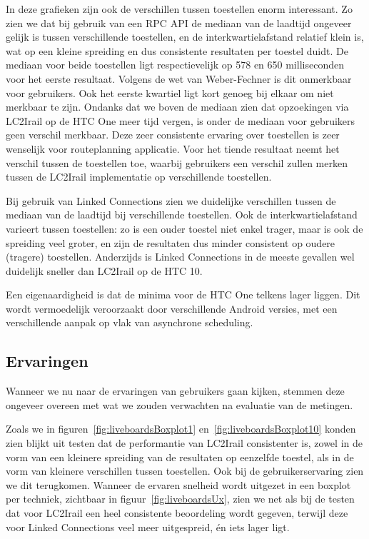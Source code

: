 In deze grafieken zijn ook de verschillen tussen toestellen enorm interessant. Zo zien we dat bij gebruik van een RPC API de mediaan van de laadtijd ongeveer gelijk is tussen verschillende toestellen, en de interkwartielafstand relatief klein is, wat op een kleine spreiding en dus consistente resultaten per toestel duidt. De mediaan voor beide toestellen ligt respectievelijk op 578 en 650 milliseconden voor het eerste resultaat. Volgens de wet van Weber-Fechner is dit onmerkbaar voor gebruikers. Ook het eerste kwartiel ligt kort genoeg bij elkaar om niet merkbaar te zijn. Ondanks dat we boven de mediaan zien dat opzoekingen via LC2Irail op de HTC One meer tijd vergen, is onder de mediaan voor gebruikers geen verschil merkbaar. Deze zeer consistente ervaring over toestellen is zeer wenselijk voor routeplanning applicatie. Voor het tiende resultaat neemt het verschil tussen de toestellen toe, waarbij gebruikers een verschil zullen merken tussen de LC2Irail implementatie op verschillende toestellen.

Bij gebruik van Linked Connections zien we duidelijke verschillen tussen de mediaan van de laadtijd bij verschillende toestellen. Ook de interkwartielafstand varieert tussen toestellen: zo is een ouder toestel niet enkel trager, maar is ook de spreiding veel groter, en zijn de resultaten dus minder consistent op oudere (tragere) toestellen. Anderzijds is Linked Connections in de meeste gevallen wel duidelijk sneller dan LC2Irail op de HTC 10.

Een eigenaardigheid is dat de minima voor de HTC One telkens lager liggen. Dit wordt vermoedelijk veroorzaakt door verschillende Android versies, met een verschillende aanpak op vlak van asynchrone scheduling.

\subsection{Ervaringen}
Wanneer we nu naar de ervaringen van gebruikers gaan kijken, stemmen deze ongeveer overeen met wat we zouden verwachten na evaluatie van de metingen.

Zoals we in figuren~\ref{fig:liveboardsBoxplot1} en~\ref{fig:liveboardsBoxplot10} konden zien blijkt uit testen dat de performantie van LC2Irail consistenter is, zowel in de vorm van een kleinere spreiding van de resultaten op eenzelfde toestel, als in de vorm van kleinere verschillen tussen toestellen. Ook bij de gebruikerservaring zien we dit terugkomen. Wanneer de ervaren snelheid wordt uitgezet in een boxplot per techniek, zichtbaar in figuur~\ref{fig:liveboardsUx}, zien we net als bij de testen dat voor LC2Irail een heel consistente beoordeling wordt gegeven, terwijl deze voor Linked Connections veel meer uitgespreid, én iets lager ligt.

